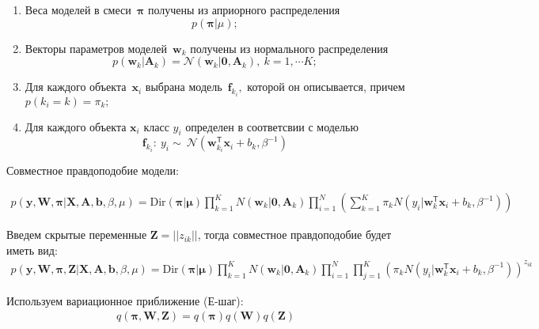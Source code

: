 \documentclass[12pt, twoside]{article}
\numberwithin{equation}{section}
\begin{document}
\begin{enumerate}
	\item Веса моделей в смеси~$\bm{\pi}$ получены из априорного распределения 
	$$p\left(\bm{\pi}|\mu\right);$$
	
	\item Векторы параметров моделей~$\textbf{w}_k$ получены из нормального распределения 
	$$p\left(\textbf{w}_k|\textbf{A}_k\right) = \mathcal{N}\left(\textbf{w}_k|\textbf{0}, \textbf{A}_{k}\right),~k=1,\cdots K;$$
	
	\item Для каждого объекта~$\textbf{x}_i$ выбрана модель~$\textbf{f}_{k_i},$ которой он описывается, причем $p\left(k_i=k\right) = \pi_k;$
	
	\item  Для каждого объекта $\textbf{x}_i$ класс $y_i$ определен в соответсвии с моделью 
	$$\textbf{f}_{k_i}:~y_i\sim~\mathcal{N}\left(\textbf{w}_{k_i}^{\mathsf{T}}\textbf{x}_i + b_k, \beta^{-1}\right)$$
\end{enumerate}

Совместное правдоподобие модели:

\begin{equation}
\label{eq:st:11}
\begin{aligned}
p(\textbf{y}, \textbf{W}, \bm{\pi}|\textbf{X}, \textbf{A}, \textbf{b}, \beta, \mu) = \text{Dir}(\bm{\pi}|\bm{\mu})\prod_{k=1}^{K}N(\textbf{w}_k|\textbf{0}, \textbf{A}_k)\prod_{i=1}^{N}\left(\sum_{k=1}^{K}\pi_kN(y_i|\textbf{w}_k^{\mathsf{T}}\textbf{x}_i+b_k, \beta^{-1})\right)\end{aligned}
\end{equation}

Введем скрытые переменные $\textbf{Z} = ||z_{ik}||$, тогда совместное правдоподобие будет иметь вид:
\begin{equation}
\label{eq:st:12}
\begin{aligned}
p(\textbf{y}, \textbf{W}, \bm{\pi}, \textbf{Z}|\textbf{X}, \textbf{A}, \textbf{b}, \beta, \mu) = \text{Dir}(\bm{\pi}|\bm{\mu})\prod_{k=1}^{K}N(\textbf{w}_k|\textbf{0}, \textbf{A}_k)\prod_{i=1}^{N}\prod_{j=1}^{K}\left(\pi_kN(y_i|\textbf{w}_k^{\mathsf{T}}\textbf{x}_i+b_k, \beta^{-1})\right)^{z_{ik}}
\end{aligned}
\end{equation}

Используем вариационное приближение (Е-шаг):
\begin{equation}
\label{eq:st:13}
\begin{aligned}
q(\bm{\pi}, \textbf{W}, \textbf{Z}) = q(\bm{\pi})q(\textbf{W})q(\textbf{Z})
\end{aligned}
\end{equation}
\end{document}
